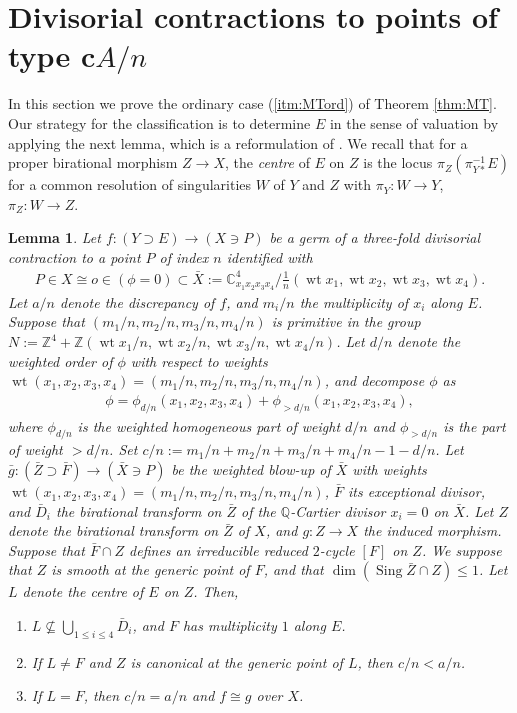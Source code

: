 \documentclass[a4paper,11pt]{amsart}
\newtheorem{lemma}[theorem]{Lemma}
\theoremstyle{definition}
\theoremstyle{remark}
\numberwithin{equation}{section}
\newcommand{\bC}{{\mathbb C}}
\newcommand{\bQ}{{\mathbb Q}}
\newcommand{\bZ}{{\mathbb Z}}
\newcommand{\Sing}{\operatorname{Sing}}
\newcommand{\wt}{\operatorname{wt}}
\begin{document}
\section{Divisorial contractions to points of type c$A/n$}\label{sec:cA/n}
In this section we prove
the ordinary case (\ref{itm:MTord}) of Theorem \ref{thm:MT}.
Our strategy for the classification
is to determine $E$ in the sense of valuation
by applying the next lemma,
which is a reformulation of \cite[Lemma 6.1]{Ka03}.
We recall that for a proper birational morphism $Z \to X$,
the \textit{centre} of $E$ on $Z$ is the locus $\pi_Z(\pi_{Y*}^{-1}E)$
for a common resolution of singularities $W$ of $Y$ and $Z$
with $\pi_Y \colon W \to Y$, $\pi_Z \colon W \to Z$.

\begin{lemma}\label{lem:gen_mtd}
Let $f \colon (Y \supset E) \to (X \ni P)$ be a germ of a
three-fold divisorial contraction to a point $P$ of index $n$
identified with
\begin{align*}
P \in X \cong o \in (\phi=0) \subset
\bar{X}:=\bC^4_{x_1x_2x_3x_4} /\frac{1}{n}(\wt x_1,\wt x_2,\wt x_3,\wt x_4).
\end{align*}
Let $a/n$ denote the discrepancy of $f$,
and $m_i/n$ the multiplicity of $x_i$ along $E$.
Suppose that $(m_1/n,m_2/n,m_3/n,m_4/n)$ is primitive in the group
$N:=\bZ^4+\bZ(\wt x_1/n,\wt x_2/n,\wt x_3/n,\wt x_4/n)$.
Let $d/n$ denote the weighted order of $\phi$ with respect to weights
$\wt(x_1,x_2,x_3,x_4)=(m_1/n,m_2/n,m_3/n,m_4/n)$,
and decompose $\phi$ as
\begin{align*}
\phi=\phi_{d/n}(x_1,x_2,x_3,x_4)+\phi_{>d/n}(x_1,x_2,x_3,x_4),
\end{align*}
where $\phi_{d/n}$ is the weighted homogeneous part of weight $d/n$
and $\phi_{>d/n}$ is the part of weight $>d/n$.
Set $c/n:=m_1/n+m_2/n+m_3/n+m_4/n-1-d/n$.
Let $\bar{g} \colon (\bar{Z} \supset \bar{F}) \to (\bar{X} \ni P)$
be the weighted blow-up of $\bar{X}$ with weights
$\wt(x_1,x_2,x_3,x_4)=(m_1/n,m_2/n,m_3/n,m_4/n)$,
$\bar{F}$ its exceptional divisor,
and $\bar{D}_i$ the birational transform on $\bar{Z}$
of the $\bQ$-Cartier divisor $x_i=0$ on $\bar{X}$.
Let $Z$ denote the birational transform on $\bar{Z}$ of $X$,
and $g \colon Z \to X$ the induced morphism.
Suppose that $\bar{F} \cap Z$ defines an irreducible reduced $2$-cycle $[F]$
on $Z$.
We suppose that $Z$ is smooth at the generic point of $F$,
and that $\dim(\Sing\bar{Z} \cap Z) \le 1$.
Let $L$ denote the centre of $E$ on $Z$.
Then,
\begin{enumerate}
\item\label{itm:non-contained}
$L \not\subseteq \bigcup_{1 \le i \le 4} \bar{D}_i$,
and $F$ has multiplicity $1$ along $E$.
\item\label{itm:L_non-surface}
If $L\neq F$ and $Z$ is canonical at the generic point of $L$,
then $c/n<a/n$.
\item\label{itm:L_surface}
If $L=F$,
then $c/n=a/n$ and $f \cong g$ over $X$.
\end{enumerate}
\end{lemma}
\end{document}
